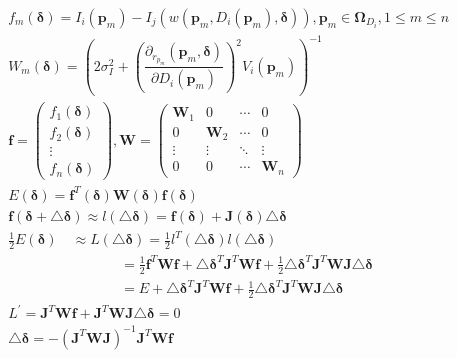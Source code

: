 \documentclass{article}
\begin{document}
\begin{CJK*}{GBK}{song}

\begin{equation}\left.\begin{aligned}
  &
f_{m}(\boldsymbol{\delta})={{I}_i(\boldsymbol{p}_m)-I_{j}(w(\boldsymbol{p}_m,D_{i}(\boldsymbol{p}_m),\boldsymbol{\delta}))},\boldsymbol{p}_m\in{\boldsymbol{\Omega}_{{D}_{i}}},1\leq m
\leq n
\\&
W_{m}(\boldsymbol{\delta})=\left(2\sigma_{I}^{2}+\left(\dfrac{\partial_{r_{{p}_m}}(\boldsymbol{p}_m,\boldsymbol{\delta})}{\partial{D_i(\boldsymbol{p}_m)}}\right)^2V_{i}(\boldsymbol{p}_m)\right)^{-1}
\\&
\boldsymbol{f} = \begin{pmatrix}
f_{1}(\boldsymbol{\delta})\\f_{2}(\boldsymbol{\delta})\\ \vdots\\f_{n}(\boldsymbol{\delta})
\end{pmatrix},
\boldsymbol{W} = \begin{pmatrix}
\boldsymbol{W}_{1}&0&\cdots&0
\\
0&\boldsymbol{W}_{2}&\cdots&0
\\
\vdots&\vdots&\ddots&\vdots
\\
0&0&\cdots&\boldsymbol{W}_{n}
\end{pmatrix}
\\&
E(\boldsymbol{\delta})=\boldsymbol{f}^{T}(\boldsymbol{\delta})\boldsymbol{W}(\boldsymbol{\delta})\boldsymbol{f}(\boldsymbol{\delta})
\\&
\boldsymbol{f}(\boldsymbol{\delta}+\triangle \boldsymbol{\delta})\approx{l(\triangle \boldsymbol{\delta})}=\boldsymbol{f}(\boldsymbol{\delta})+\boldsymbol{J}(\boldsymbol{\delta})\triangle \boldsymbol{\delta}
\\&
\frac{1}{2}E(\boldsymbol{\delta})\quad\approx{ L(\triangle \boldsymbol{\delta}) }=\frac{1}{2}l^{T}(\triangle \boldsymbol{\delta})l(\triangle \boldsymbol{\delta})
\\&
\qquad\qquad\qquad\qquad= \frac{1}{2}\boldsymbol{f}^{T}\boldsymbol{W}\boldsymbol{f}+\triangle \boldsymbol{\delta}^{T}\boldsymbol{J}^{T}\boldsymbol{W}\boldsymbol{f}+ \frac{1}{2}\triangle \boldsymbol{\delta}^{T}\boldsymbol{J}^{T}\boldsymbol{W}\boldsymbol{J}\triangle \boldsymbol{\delta}
\\&
\qquad\qquad\qquad\qquad=E+\triangle \boldsymbol{\delta}^{T}\boldsymbol{J}^{T}\boldsymbol{W}\boldsymbol{f}+ \frac{1}{2}\triangle \boldsymbol{\delta}^{T}\boldsymbol{J}^{T}\boldsymbol{W}\boldsymbol{J}\triangle \boldsymbol{\delta}
\\&
L^{'} = \boldsymbol{J}^{T}\boldsymbol{W}\boldsymbol{f}+\boldsymbol{J}^{T}\boldsymbol{W}\boldsymbol{J}\triangle \boldsymbol{\delta}=0
\\&
\triangle \boldsymbol{\delta}=-(\boldsymbol{J}^{T}\boldsymbol{W}\boldsymbol{J})^{-1}\boldsymbol{J}^{T}\boldsymbol{W}\boldsymbol{f}
\end{aligned}\right.\end{equation}


\end{CJK*}
\end{document}
